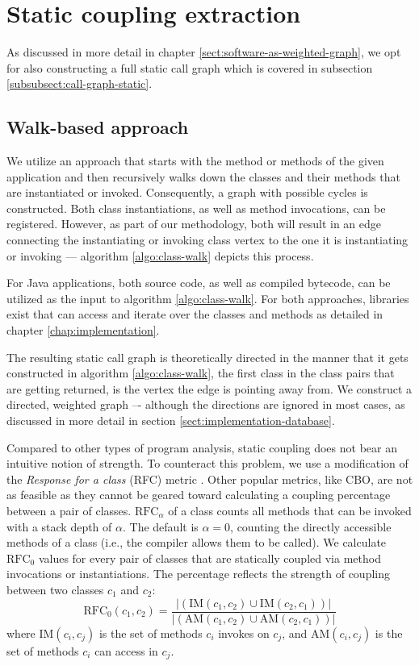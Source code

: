 \documentclass[12pt,a4paper]{report}
\begin{document}
\section{Static coupling extraction} \label{sect:static-coupling-extraction}

As discussed in more detail in chapter \ref{sect:software-as-weighted-graph},
we opt for also constructing a full static call graph which is covered in
subsection \ref{subsubsect:call-graph-static}.


\subsection{Walk\hyp based approach}

We utilize an approach that starts with the  method or methods of
the given application and then recursively walks down the classes and their
methods that are instantiated or invoked. Consequently, a graph with possible
cycles is constructed. Both class instantiations, as well as method
invocations, can be registered. However, as part of our methodology, both will
result in an edge connecting the instantiating or invoking class vertex to the
one it is instantiating or invoking --- algorithm \ref{algo:class-walk} depicts
this process.

For Java applications, both source code, as well as compiled bytecode, can be
utilized as the input to algorithm \ref{algo:class-walk}. For both approaches,
libraries exist that can access and iterate over the classes and methods as
detailed in chapter \ref{chap:implementation}.

The resulting static call graph is theoretically directed in the manner that it
gets constructed in algorithm \ref{algo:class-walk}, the first class in the
class pairs that are getting returned, is the vertex the edge is pointing away
from. We construct a directed, weighted graph --\hyp
although the directions are ignored in most cases, as discussed in
more detail in section \ref{sect:implementation-database}.

Compared to other types of program analysis, static coupling does not bear an
intuitive notion of strength.
To counteract this problem, we use a modification of the
\textit{Response for a class} (RFC) metric \cite{briand1999unified}.
Other popular metrics, like CBO, are not as feasible
as they cannot be geared toward calculating a coupling percentage between
a pair of classes.
\(\text{RFC}_\alpha\) of a class counts all methods that can be invoked with
a stack depth of \(\alpha\). The default is \(\alpha = 0\),
counting the directly accessible methods of a class
(i.e., the compiler allows them to be called).
We calculate $\text{RFC}_0$ values for every pair of classes that are statically
coupled via method invocations or instantiations.
The percentage reflects the strength of coupling between two classes $c_1$ and $c_2$:
\[
  \text{RFC}_{0}(c_1, c_2) = \frac{\vert (\text{IM}(c_1, c_2) \cup \text{IM}(c_2, c_1)) \vert}{\vert (\text{AM}(c_1, c_2) \cup \text{AM}(c_2, c_1)) \vert}
\]
where \(\text{IM}(c_i, c_j)\) is the set of methods $c_i$ invokes on $c_j$,
and \(\text{AM}(c_i, c_j)\) is the set of methods $c_i$ can access in $c_j$.
\end{document}

